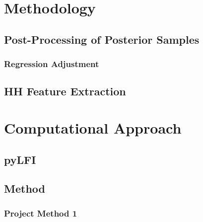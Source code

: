 \chapter{Methodology}\label{chap:methodology}

\section{Post-Processing of Posterior Samples}\label{sec:post_processing}

\subsection{Regression Adjustment}\label{sec:reg_adjust}

\section{HH Feature Extraction}\label{sec:hh_feature_extract}

\chapter{Computational Approach}\label{chap:computational}

\section{pyLFI}\label{sec:pylfi}

\section{Method}\label{sec:Method}

\subsection{Project Method 1}\label{sec:project method}

